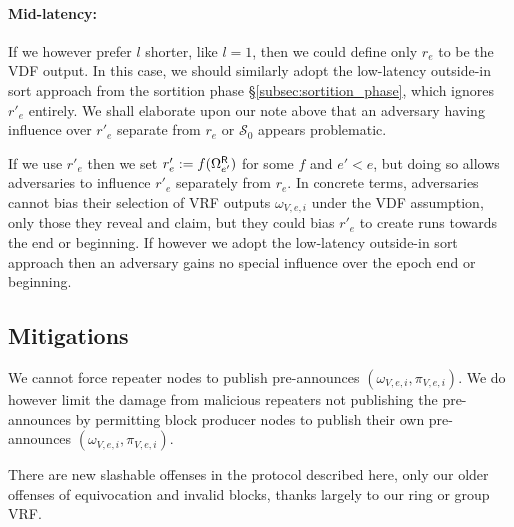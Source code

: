 \paragraph{Mid-latency:} 
If we however prefer $l$ shorter, like $l=1$, then we could define only $r_e$ to be the VDF output.  In this case, we should similarly adopt the low-latency outside-in sort approach from the sortition phase \S\ref{subsec:sortition_phase}, which ignores $r'_e$ entirely.  We shall elaborate upon our note above that an adversary having influence over $r'_e$ separate from $r_e$ or $\mathcal{S}_0$ appears problematic.

If we use $r'_e$ then we set $r'_e := f(\Omega^{\mathsf{R}}_{e'})$ for some $f$ and $e' < e$, but doing so allows adversaries to influence $r'_e$ separately from $r_e$.  In concrete terms, adversaries cannot bias their selection of VRF outputs $\omega_{V,e,i}$ under the VDF assumption, only those they reveal and claim, but they could bias $r'_e$ to create runs towards the end or beginning.  If however we adopt the low-latency outside-in sort approach then an adversary gains no special influence over the epoch end or beginning. 


\subsection{Mitigations}\label{subsec:slashing}

We cannot force repeater nodes to publish pre-announces $(\omega_{V,e,i},\pi_{V,e,i})$.  We do however limit the damage from malicious repeaters not publishing the pre-announces by permitting block producer nodes to publish their own pre-announces $(\omega_{V,e,i},\pi_{V,e,i})$.  

There are new slashable offenses in the protocol described here, only our older offenses of equivocation and invalid blocks, thanks largely to our ring or group VRF.  



